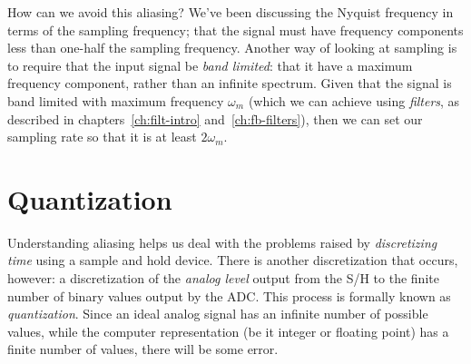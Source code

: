 How can we avoid this aliasing? We've been discussing the Nyquist
frequency in terms of the sampling frequency; that the signal must
have frequency components less than one-half the sampling frequency.
Another way of looking at sampling is to require that the input signal
be \emph{band limited}: that it have a maximum frequency component,
rather than an infinite spectrum. Given that the signal is band
limited with maximum frequency $\omega_m$ (which we can achieve using
\emph{filters}, as described in chapters~\ref{ch:filt-intro}
and~\ref{ch:fb-filters}), then we can set our sampling rate so that it
is at least $2\omega_m$.



\section{Quantization}

Understanding aliasing helps us deal with the problems raised by \emph{discretizing time} using
a sample and hold device. There is another discretization that occurs,
however: a discretization of the \emph{analog level} output from the S/H to
the finite number of binary values output by the ADC. This process is
formally known as \emph{quantization}. Since an ideal analog signal
has an infinite number of possible values, while the computer
representation (be it integer or floating point) has a finite number
of values, there will be some error.

